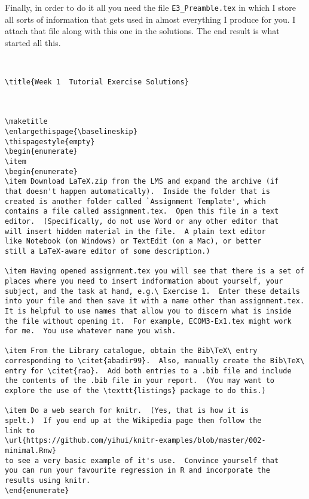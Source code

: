 Finally, in order to do it all you need the file
\texttt{E3\_Preamble.tex} in which I store all sorts of information
that gets used in almost everything I produce for you.  I attach that
file along with this one in the solutions.  The end result is what
started all this.

\newpage

\begin{lstlisting}


\title{Week 1  Tutorial Exercise Solutions}



\maketitle
\enlargethispage{\baselineskip}
\thispagestyle{empty}
\begin{enumerate}
\item 
\begin{enumerate}
\item Download LaTeX.zip from the LMS and expand the archive (if
that doesn't happen automatically).  Inside the folder that is
created is another folder called `Assignment Template', which
contains a file called assignment.tex.  Open this file in a text
editor.  (Specifically, do not use Word or any other editor that
will insert hidden material in the file.  A plain text editor
like Notebook (on Windows) or TextEdit (on a Mac), or better
still a LaTeX-aware editor of some description.)
      
\item Having opened assignment.tex you will see that there is a set of
places where you need to insert indformation about yourself, your
subject, and the task at hand, e.g.\ Exercise 1.  Enter these details
into your file and then save it with a name other than assignment.tex.
It is helpful to use names that allow you to discern what is inside
the file without opening it.  For example, ECOM3-Ex1.tex might work
for me.  You use whatever name you wish.
      
\item From the Library catalogue, obtain the Bib\TeX\ entry
corresponding to \citet{abadir99}.  Also, manually create the Bib\TeX\
entry for \citet{rao}.  Add both entries to a .bib file and include
the contents of the .bib file in your report.  (You may want to
explore the use of the \texttt{listings} package to do this.)
      
\item Do a web search for knitr.  (Yes, that is how it is
spelt.)  If you end up at the Wikipedia page then follow the
link to
\url{https://github.com/yihui/knitr-examples/blob/master/002-minimal.Rnw}
to see a very basic example of it's use.  Convince yourself that
you can run your favourite regression in R and incorporate the
results using knitr.
\end{enumerate}


\end{lstlisting}
